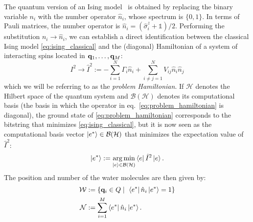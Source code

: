 \documentclass[fleqn,10pt]{wlscirep}
\DeclareMathOperator*{\argmin}{arg\,min}
\begin{document}
The quantum version of an Ising model~\cite{ising_quantum, ising_quantum2} is obtained by replacing the binary variable $n_i$ with the number operator $\hat{n}_i$, whose spectrum is $\{0,1\}$. In terms of Pauli matrices, the number operator is $\hat{n}_i = (\hat{\sigma}_i^z + \mathds{1})/2$. Performing the substitution $n_i \rightarrow \hat{n}_i$, we can establish a direct identification between the classical Ising model \eqref{eq:ising_classical} and the (diagonal) Hamiltonian of a system of interacting spins located in $\vb{q}_1, \ldots, \vb{q}_M$:
\begin{equation}\label{eq:problem_hamiltonian}
    I^2 \rightarrow \hat{I}^2 := - \sum_{i=1}^N \Gamma_i \hat{n}_i +\sum_{i\neq j=1}^{N} V_{ij} \hat{n}_i \hat{n}_j
\end{equation}
which we will be referring to as the \textit{problem Hamiltonian}. If $\mathcal{H}$ denotes the Hilbert space of the quantum system and $\mathcal{B}(\mathcal{H})$ denotes its computational basis (the basis in which the operator in eq.~\eqref{eq:problem_hamiltonian} is diagonal), the ground state of \eqref{eq:problem_hamiltonian} corresponds to the bitstring that minimizes \eqref{eq:ising_classical}, but it is now seen as the computational basis vector $\ket{e^*} \in \mathcal{B}(\mathcal{H})$ that minimizes the expectation value of $\hat{I}^2$:
\begin{equation}\label{eq:bs_best}
    \ket{e^*} := \argmin_{\ket{e} \in \mathcal{B}(\mathcal{H})} \bra{e} \hat{I}^2 \ket{e}.
\end{equation}
The position and number of the water molecules are then given by:
\begin{align}\label{eq:wat_numcoord}
    \mathcal{W} &:= \{\vb{q}_i \in Q \mid \ \bra{e^*}\hat{n}_i \ket{e^*} = 1 \} \\
    \mathcal{N} &:=  \sum_{i=1}^M \bra{e^*} \hat{n}_i \ket{e^*}.\nonumber
\end{align}
\end{document}
